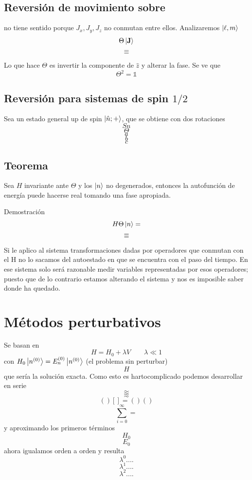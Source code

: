 \documentclass[10pt,oneside]{CBFT_book}
\begin{document}
\subsection{Reversión de movimiento sobre }


no tiene sentido porque $J_x,J_y,J_z$ no conmutan entre ellos. Analizaremos $\Ket{\ell,m}$
\[
	\Theta \Ket{\vb{J}} 
\]
\[
	\equiv 
\]

Lo que hace $\Theta$ es invertir la componente de $\hat{z}$ y alterar la fase. Se ve que 
\[
	\Theta^2 = \mathbb{1}
\]

\subsection{Reversión para sistemas de spin $1/2$}

Sea un estado general up de spin $\Ket{\hat{n};+}$, que se obtiene con dos rotaciones 
\[
	Sn
\]
\[
	\Theta
\]
\[
	a
\]
\[
	b
\]
\[
	c
\]

\subsection{Teorema}

Sea $H$ invariante ante $\Theta$ y los $\Ket{n}$ no degenerados, entonces la autofunción de energía puede 
hacerse real tomando una fase apropiada.

Demostración 
\[
	H \Theta  \Ket{n} =
\]
\[
	=
\]
\[
	=
\]

Si le aplico al sistema transformaciones dadas por operadores que conmutan con el H no lo sacamos del 
autoestado en que se encuentra con el paso del tiempo.
En ese sistema solo será razonable medir variables representadas por esos operadores; puesto que de lo 
contrario estamos alterando el sistema y nos es imposible saber donde ha quedado.

\section{Métodos perturbativos}

Se basan en 
\[
	H = H_0 + \lambda V \qquad \lambda \ll 1
\]
con $ H_0\Ket{n^{(0)}} = E_n^{(0)}\Ket{n^{(0)}}$ (el problema sin perturbar)
\[
	H
\]
que sería la solución exacta.
Como esto es hartocomplicado podemos desarrollar en serie 
\[
	\approx 
\]
\[
	\approx 
\]
\[
	()[] = ()()
\]
\[
	\sum_{i=0}^\infty =
\]
y aproximando los primeros términos 
\[
	H_0
\]
\[
	E_0
\]
ahora igualamos orden a orden y resulta 
\[
	\lambda^0 ....
\]
\[
	\lambda^1 ....
\]
\[
	\lambda^2 ....
\]
\end{document}
